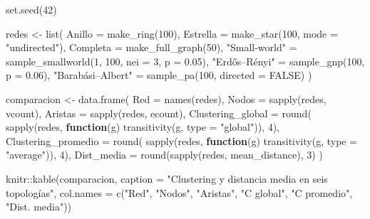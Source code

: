 \documentclass[
  letterpaper,
  DIV=11,
  numbers=noendperiod]{scrreprt}
\newenvironment{Shaded}{\begin{snugshade}}{\end{snugshade}}
\newcommand{\AttributeTok}[1]{\textcolor[rgb]{0.40,0.45,0.13}{#1}}
\newcommand{\ConstantTok}[1]{\textcolor[rgb]{0.56,0.35,0.01}{#1}}
\newcommand{\ControlFlowTok}[1]{\textcolor[rgb]{0.00,0.23,0.31}{\textbf{#1}}}
\newcommand{\DecValTok}[1]{\textcolor[rgb]{0.68,0.00,0.00}{#1}}
\newcommand{\FloatTok}[1]{\textcolor[rgb]{0.68,0.00,0.00}{#1}}
\newcommand{\FunctionTok}[1]{\textcolor[rgb]{0.28,0.35,0.67}{#1}}
\newcommand{\NormalTok}[1]{\textcolor[rgb]{0.00,0.23,0.31}{#1}}
\newcommand{\OtherTok}[1]{\textcolor[rgb]{0.00,0.23,0.31}{#1}}
\newcommand{\SpecialCharTok}[1]{\textcolor[rgb]{0.37,0.37,0.37}{#1}}
\newcommand{\StringTok}[1]{\textcolor[rgb]{0.13,0.47,0.30}{#1}}
\begin{document}
\begin{Shaded}
\begin{Highlighting}[]
\FunctionTok{set.seed}\NormalTok{(}\DecValTok{42}\NormalTok{)}

\NormalTok{redes }\OtherTok{\textless{}{-}} \FunctionTok{list}\NormalTok{(}
  \AttributeTok{Anillo          =} \FunctionTok{make\_ring}\NormalTok{(}\DecValTok{100}\NormalTok{),}
  \AttributeTok{Estrella        =} \FunctionTok{make\_star}\NormalTok{(}\DecValTok{100}\NormalTok{, }\AttributeTok{mode =} \StringTok{"undirected"}\NormalTok{),}
  \AttributeTok{Completa        =} \FunctionTok{make\_full\_graph}\NormalTok{(}\DecValTok{50}\NormalTok{),}
  \StringTok{"Small{-}world"}   \OtherTok{=} \FunctionTok{sample\_smallworld}\NormalTok{(}\DecValTok{1}\NormalTok{, }\DecValTok{100}\NormalTok{, }\AttributeTok{nei =} \DecValTok{3}\NormalTok{, }\AttributeTok{p =} \FloatTok{0.05}\NormalTok{),}
  \StringTok{"Erdős–Rényi"}   \OtherTok{=} \FunctionTok{sample\_gnp}\NormalTok{(}\DecValTok{100}\NormalTok{, }\AttributeTok{p =} \FloatTok{0.06}\NormalTok{),}
  \StringTok{"Barabási–Albert"} \OtherTok{=} \FunctionTok{sample\_pa}\NormalTok{(}\DecValTok{100}\NormalTok{, }\AttributeTok{directed =} \ConstantTok{FALSE}\NormalTok{)}
\NormalTok{)}
\end{Highlighting}
\end{Shaded}

\begin{Shaded}
\begin{Highlighting}[]
\NormalTok{comparacion }\OtherTok{\textless{}{-}} \FunctionTok{data.frame}\NormalTok{(}
  \AttributeTok{Red =} \FunctionTok{names}\NormalTok{(redes),}
  \AttributeTok{Nodos =} \FunctionTok{sapply}\NormalTok{(redes, vcount),}
  \AttributeTok{Aristas =} \FunctionTok{sapply}\NormalTok{(redes, ecount),}
  \AttributeTok{Clustering\_global =} \FunctionTok{round}\NormalTok{(}
    \FunctionTok{sapply}\NormalTok{(redes, }\ControlFlowTok{function}\NormalTok{(g) }\FunctionTok{transitivity}\NormalTok{(g, }\AttributeTok{type =} \StringTok{"global"}\NormalTok{)), }\DecValTok{4}\NormalTok{),}
  \AttributeTok{Clustering\_promedio =} \FunctionTok{round}\NormalTok{(}
    \FunctionTok{sapply}\NormalTok{(redes, }\ControlFlowTok{function}\NormalTok{(g) }\FunctionTok{transitivity}\NormalTok{(g, }\AttributeTok{type =} \StringTok{"average"}\NormalTok{)), }\DecValTok{4}\NormalTok{),}
  \AttributeTok{Dist\_media =} \FunctionTok{round}\NormalTok{(}\FunctionTok{sapply}\NormalTok{(redes, mean\_distance), }\DecValTok{3}\NormalTok{)}
\NormalTok{)}

\NormalTok{knitr}\SpecialCharTok{::}\FunctionTok{kable}\NormalTok{(comparacion,}
             \AttributeTok{caption =} \StringTok{"Clustering y distancia media en seis topologías"}\NormalTok{,}
             \AttributeTok{col.names =} \FunctionTok{c}\NormalTok{(}\StringTok{"Red"}\NormalTok{, }\StringTok{"Nodos"}\NormalTok{, }\StringTok{"Aristas"}\NormalTok{, }\StringTok{"C global"}\NormalTok{, }
                           \StringTok{"C promedio"}\NormalTok{, }\StringTok{"Dist. media"}\NormalTok{))}
\end{Highlighting}
\end{Shaded}
\end{document}
